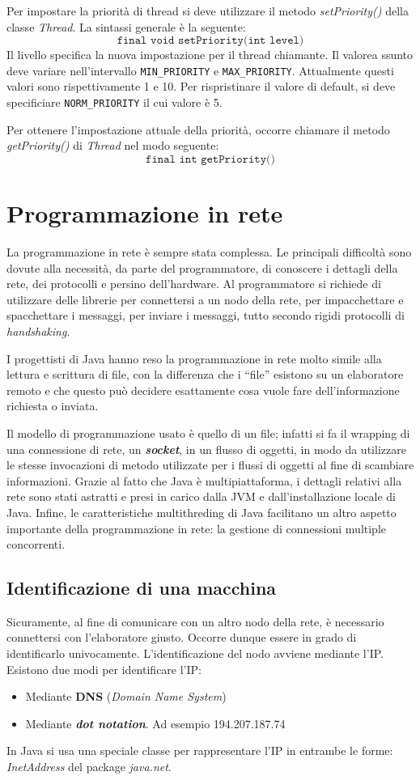 \documentclass[12pt]{report}
\begin{document}
Per impostare la priorità di thread si deve utilizzare il metodo \textit{setPriority()} della classe \textit{Thread}. La sintassi generale è la seguente:
\[
\texttt{final void setPriority(int level)}
\]
Il livello specifica la nuova impostazione per il thread chiamante. Il valorea ssunto deve variare nell'intervallo \texttt{MIN\_PRIORITY} e \texttt{MAX\_PRIORITY}. Attualmente questi valori sono rispettivamente 1 e 10. Per rispristinare il valore di default, si deve specificiare \texttt{NORM\_PRIORITY} il cui valore è 5.

Per ottenere l'impostazione attuale della priorità, occorre chiamare il metodo \textit{getPriority()} di \textit{Thread} nel modo seguente:
\[
\texttt{final int getPriority()}
\]
\section{Programmazione in rete}
La programmazione in rete è sempre stata complessa. Le principali difficoltà sono dovute alla necessità, da parte del programmatore, di conoscere i dettagli della rete, dei protocolli e persino dell'hardware. Al programmatore si richiede di utilizzare delle librerie per connettersi a un nodo della rete, per impacchettare e spacchettare i messaggi, per inviare i messaggi, tutto secondo rigidi protocolli di \textit{handshaking}.

I progettisti di Java hanno reso la programmazione in rete molto simile alla lettura e scrittura di file, con la differenza che i ``file'' esistono su un elaboratore remoto e che questo può decidere esattamente cosa vuole fare dell'informazione richiesta o inviata.

Il modello di programmazione usato è quello di un file; infatti si fa il wrapping di una connessione di rete, un \textbf{\textit{socket}}, in un flusso di oggetti, in modo da utilizzare le stesse invocazioni di metodo utilizzate per i flussi di oggetti al fine di scambiare informazioni. Grazie al fatto che Java è multipiattaforma, i dettagli relativi alla rete sono stati astratti e presi in carico dalla JVM e dall'installazione locale di Java. Infine, le caratteristiche multithreding di Java facilitano un altro aspetto importante della programmazione in rete: la gestione di connessioni multiple concorrenti.
\subsection{Identificazione di una macchina}
Sicuramente, al fine di comunicare con un altro nodo della rete, è necessario connettersi con l'elaboratore giusto. Occorre dunque essere in grado di identificarlo univocamente. L'identificazione del nodo avviene mediante l'IP. Esistono due modi per identificare l'IP:
\begin{itemize}
	\item Mediante \textbf{DNS} (\textit{Domain Name System})
	\item Mediante \textbf{\textit{dot notation}}. Ad esempio 194.207.187.74
\end{itemize}
In Java si usa una speciale classe per rappresentare l'IP in entrambe le forme: \textit{InetAddress} del package \textit{java.net}.
\end{document}
